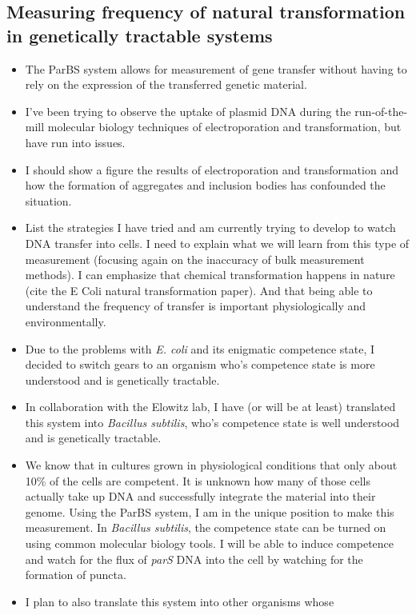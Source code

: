 \subsection*{Measuring frequency of natural transformation in genetically
tractable systems}
\begin{itemize}
	\item The ParBS system allows for measurement of gene transfer without
		having to rely on the expression of the transferred genetic material.
	\item I've been trying to observe the uptake of plasmid DNA during the
		run-of-the-mill molecular biology techniques of electroporation
		and transformation, but have run into issues. 
	\item I should show a figure the results of electroporation and
		transformation and how the formation of aggregates and inclusion
		bodies has confounded the situation. 
	\item List the strategies I have tried and am currently trying to
		develop to watch DNA transfer into cells. I need to explain what
		we will learn from this type of measurement (focusing again on
		the inaccuracy of bulk measurement methods). I can emphasize
		that chemical transformation happens in nature (cite the E Coli
		natural transformation paper). And that being able to understand
		the frequency of transfer is important physiologically and
		environmentally. 
	\item Due to the problems with \textit{E. coli} and its enigmatic
		competence state, I decided to switch gears to an organism who's
		competence state is more understood and is genetically
		tractable. 
	\item In collaboration with the Elowitz lab, I have (or will be at
		least) translated this system into \textit{Bacillus subtilis},
		who's competence state is well understood and is genetically
		tractable. 
	\item We know that in cultures grown in physiological conditions that
		only about 10\% of the cells are competent.  It is unknown how
		many of those cells actually take up DNA and successfully
		integrate the material into their genome. Using the ParBS
		system,  I am in the unique position to make this measurement.
		In \textit{Bacillus subtilis}, the competence state can be
		turned on using common molecular biology tools. I will be able
		to induce competence and watch for the flux of \textit{parS} DNA
		into the cell by watching for the formation of puncta. 
	\item I plan to also translate this system into other organisms whose

\end{itemize}
